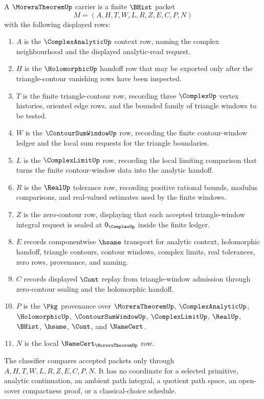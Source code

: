 \begin{definition}
\label{def:morera-theorem-carrier}
A $\MoreraTheoremUp$ carrier is a finite $\BHist$ packet
$$
M=(A,H,T,W,L,R,Z,E,C,P,N)
$$
with the following displayed rows:
\begin{enumerate}
\item $A$ is the $\ComplexAnalyticUp$ context row, naming the complex neighbourhood and the displayed analytic-read request.
\item $H$ is the $\HolomorphicUp$ handoff row that may be exported only after the triangle-contour vanishing rows have been inspected.
\item $T$ is the finite triangle-contour row, recording three $\ComplexUp$ vertex histories, oriented edge rows, and the bounded family of triangle windows to be tested.
\item $W$ is the $\ContourSumWindowUp$ row, recording the finite contour-window ledger and the local sum requests for the triangle boundaries.
\item $L$ is the $\ComplexLimitUp$ row, recording the local limiting comparison that turns the finite contour-window data into the analytic handoff.
\item $R$ is the $\RealUp$ tolerance row, recording positive rational bounds, modulus comparisons, and real-valued estimates used by the finite windows.
\item $Z$ is the zero-contour row, displaying that each accepted triangle-window integral request is sealed at $\mathsf{0}_{\ComplexUp}$ inside the finite ledger.
\item $E$ records componentwise $\hsame$ transport for analytic context, holomorphic handoff, triangle contours, contour windows, complex limits, real tolerances, zero rows, provenance, and naming.
\item $C$ records displayed $\Cont$ replay from triangle-window admission through zero-contour sealing and the holomorphic handoff.
\item $P$ is the $\Pkg$ provenance over $\MoreraTheoremUp$, $\ComplexAnalyticUp$, $\HolomorphicUp$, $\ContourSumWindowUp$, $\ComplexLimitUp$, $\RealUp$, $\BHist$, $\hsame$, $\Cont$, and $\NameCert$.
\item $N$ is the local $\NameCert_{\MoreraTheoremUp}$ row.
\end{enumerate}
The classifier compares accepted packets only through $A,H,T,W,L,R,Z,E,C,P,N$. It has no coordinate for a selected primitive, analytic continuation, an ambient path integral, a quotient path space, an open-cover compactness proof, or a classical-choice schedule.
\end{definition}

